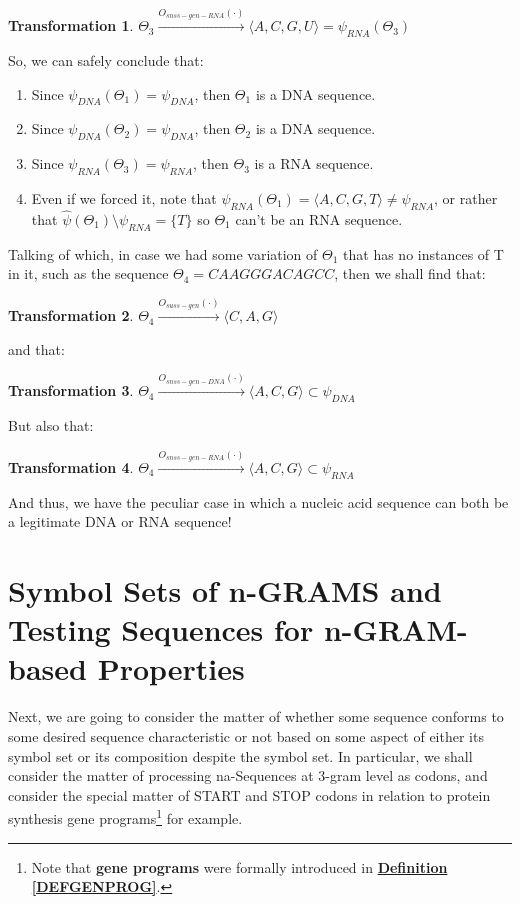 \documentclass[a4paper, 18pt]{book} %
\newtheorem{trans}{Transformation}
\begin{document}
\begin{trans}
$\Theta_3 \xrightarrow{O_{snss-gen-RNA}(\cdot)} \langle A, C, G, U \rangle = \psi_{RNA}(\Theta_3)$\\
\end{trans}

So, we can safely conclude that:

\begin{enumerate}
\item Since $\psi_{DNA}(\Theta_1) = \psi_{DNA}$, then $\Theta_1$ is a DNA sequence.
\item Since $\psi_{DNA}(\Theta_2) = \psi_{DNA}$, then $\Theta_2$ is a DNA sequence.
\item Since $\psi_{RNA}(\Theta_3) = \psi_{RNA}$, then $\Theta_3$ is a RNA sequence.
\item Even if we forced it, note that $\psi_{RNA}(\Theta_1) = \langle A, C, G, T \rangle \neq \psi_{RNA}$, or rather that $\hat{\psi}(\Theta_1) \setminus \psi_{RNA} = \{T\}$ so $\Theta_1$ can't be an RNA sequence.
\end{enumerate} 

Talking of which, in case we had some variation of $\Theta_1$ that has no instances of T in it, such as the sequence $\Theta_4 = CAAGGGACAGCC$, then we shall find that:

\begin{trans}
$\Theta_4 \xrightarrow{O_{suss-gen}(\cdot)} \langle C, A, G \rangle$
\end{trans}

and that:

\begin{trans}
$\Theta_4 \xrightarrow{O_{snss-gen-DNA}(\cdot)} \langle A, C, G \rangle \subset \psi_{DNA}$
\end{trans}

But also that:

\begin{trans}
$\Theta_4 \xrightarrow{O_{snss-gen-RNA}(\cdot)} \langle A, C, G \rangle \subset \psi_{RNA}$
\end{trans}

And thus, we have the peculiar case in which a nucleic acid sequence can both be a legitimate DNA or RNA sequence! 


\section{Symbol Sets of n-GRAMS and Testing Sequences for n-GRAM-based Properties}


Next, we are going to consider the matter of whether some sequence conforms to some desired sequence characteristic or not based on some aspect of either its symbol set or its composition despite the symbol set. In particular, we shall consider the matter of processing na-Sequences at 3-gram level as codons, and consider the special matter of START and STOP codons in relation to protein synthesis gene programs\footnote{Note that \textbf{gene programs} were formally introduced in \textbf{\hyperref[DEFGENPROG]{Definition \ref{DEFGENPROG}}}.} for example.
\end{document}

